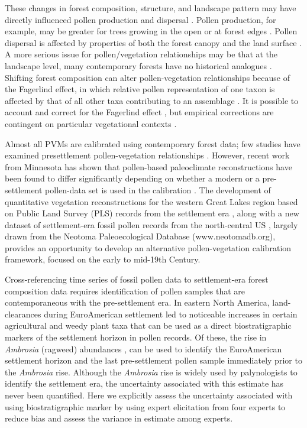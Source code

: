 \documentclass[12pt]{article}
\begin{document}
These changes in forest composition, structure, and landscape pattern
may have directly influenced pollen production and dispersal
\citep{kujawa2015}.  Pollen production, for example, may be greater
for trees growing in the open or at forest edges \citep{XXX}.  Pollen
dispersal is affected by properties of both the forest canopy and the
land surface \citep{jackson1999pollen}.  A more serious issue for
pollen/vegetation relationships may be that at the landscape level,
many contemporary forests have no historical analogues
\citep{goring_witness}. Shifting forest composition can alter
pollen-vegetation relationships because of the Fagerlind effect, in
which relative pollen representation of one taxon is affected by that
of all other taxa contributing to an assemblage
\citep{prentice1988records}. It is possible to account and correct for
the Fagerlind effect \citep{prentice1986, jackson1995exploration}, but
empirical corrections are contingent on particular vegetational
contexts \citep{jackson1998quantitative}.

Almost all PVMs are calibrated using contemporary forest data; few
studies have examined presettlement pollen-vegetation relationships
\citep{schwartz1989predicting}.  However, recent work from Minnesota
has shown that pollen-based paleoclimate reconstructions have been
found to differ significantly depending on whether a modern or a
pre-settlement pollen-data set is used in the calibration
\citep{st2014bias}.  The development of quantitative vegetation
reconstructions for the western Great Lakes region based on Public
Land Survey (PLS) records from the settlement era
\citep{goring_witness, bourdo1956review,
  schulte2001original, almendinger1996minnesota}, along with a new dataset of settlement-era
fossil pollen records from the north-central US \citep{kujawa2015},
largely drawn from the Neotoma Paleoecological Database
(www.neotomadb.org), provides an opportunity to develop an alternative
pollen-vegetation calibration framework, focused on the early to
mid-19th Century.

Cross-referencing time series of fossil pollen data to settlement-era
forest composition data requires identification of pollen samples that
are contemporaneous with the pre-settlement era.  In eastern North
America, land-clearances during EuroAmerican settlement led to
noticeable increases in certain agricultural and weedy plant taxa that
can be used as a direct biostratigraphic markers of the settlement
horizon in pollen records.  Of these, the rise in \textit{Ambrosia}
(ragweed) abundances \citep{mcandrews1988human}, can be used to
identify the EuroAmerican settlement horizon and the last
pre-settlement pollen sample immediately prior to the
\textit{Ambrosia} rise. Although the \textit{Ambrosia} rise is widely
used by palynologists to identify the settlement era, the uncertainty
associated with this estimate has never been quantified.  Here we
explicitly assess the uncertainty associated with using
biostratigraphic marker by using expert elicitation from four experts
to reduce bias and assess the variance in estimate among experts.
\end{document}
